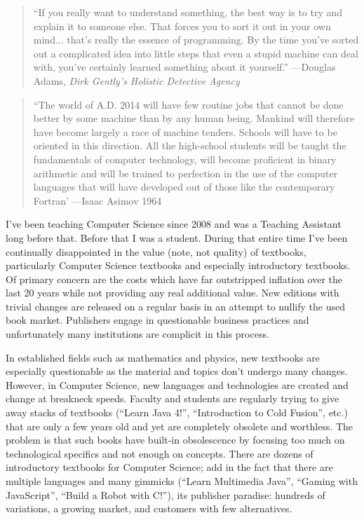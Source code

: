 
\begin{quote}
``If you really want to understand something, the best way is to try and explain it to someone else. That forces you to sort it out in your own mind... that's really the essence of programming. By the time you've sorted out a complicated idea into little steps that even a stupid machine can deal with, you've certainly learned something about it yourself.'' ---Douglas Adams, \emph{Dirk Gently's Holistic Detective Agency} \cite{Adams1987}
\end{quote}

\begin{quote}
``The world of A.D. 2014 will have few routine jobs that cannot be done better by some machine than by any human being. Mankind will therefore have become largely a race of machine tenders. Schools will have to be oriented in this direction. All the high-school students will be taught the fundamentals of computer technology, will become proficient in binary arithmetic and will be trained to perfection in the use of the computer languages that will have developed out of those like the contemporary Fortran' 
---Isaac Asimov 1964
\end{quote}

I've been teaching Computer Science since 2008 and was a Teaching Assistant long before that.  Before that
I was a student.  During that entire time I've been continually disappointed in the value (note, not quality) of
textbooks, particularly Computer Science textbooks and especially introductory textbooks.  Of primary concern
are the costs which have far outstripped inflation over the last 20 years while not providing any 
real additional value.  New editions with trivial changes are released on a regular basis in an attempt to
nullify the used book market.  Publishers engage in questionable business practices and unfortunately many
institutions are complicit in this process.

In established fields such as mathematics and physics, new textbooks are especially questionable as the
material and topics don't undergo many changes.  However, in Computer Science, new languages and
technologies are created and change at breakneck speeds.  Faculty and students are regularly trying to
give away stacks of textbooks (``Learn Java 4!'', ``Introduction to Cold Fusion'', etc.) that are only a few
years old and yet are completely obsolete and worthless.  The problem is that such books have built-in
obsolescence by focusing too much on technological specifics and not enough on concepts.  There are
dozens of introductory textbooks for Computer Science; add in the fact that there are multiple languages
and many gimmicks (``Learn Multimedia Java'', ``Gaming with JavaScript'', ``Build a Robot with C!''), its
publisher paradise: hundreds of variations, a growing market, and customers with few alternatives.

